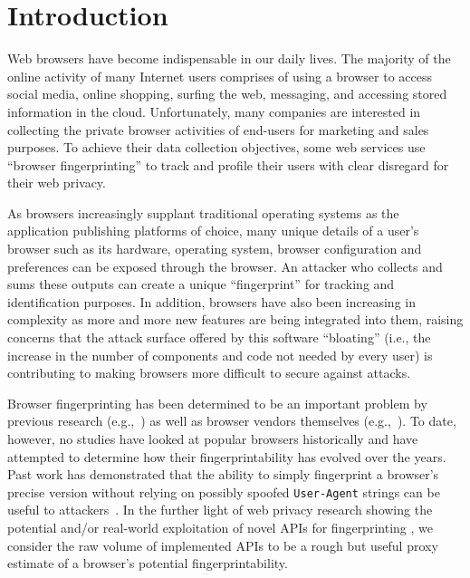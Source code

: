 \section{Introduction}
\label{sec:introduction}

Web browsers have become indispensable in our daily lives. The
majority of the online activity of many Internet users comprises of
using a browser to access social media, online shopping, surfing the
web, messaging, and accessing stored information in the cloud.
Unfortunately, many companies are interested in collecting
the private browser activities of end-users for marketing and sales
purposes. To achieve their data collection objectives, some web
services use ``browser fingerprinting'' to track and profile their
users with clear disregard for their web privacy.

As browsers increasingly supplant traditional operating systems as the
application publishing platforms of choice, 
many unique details of a user's browser such as its hardware,
operating system, browser configuration and preferences can be exposed
through the browser. An attacker who collects and sums these outputs
can create a unique ``fingerprint'' for tracking and identification
purposes. In addition, browsers have also been increasing in
complexity as more and more new features are being integrated into
them, raising concerns that the attack surface offered by this
software ``bloating'' (i.e., the increase in the number of components
and code not needed by every user) is contributing to making browsers
more difficult to secure against attacks.

Browser fingerprinting has been determined to be an important problem
by previous research
(e.g.,~\cite{cookiemonster-SP13,panopticlick,mowery2012pixel,fpdetective})
as well as browser vendors themselves (e.g.,~\cite{safari-privacy,brave-fpbudget,firefox-fingerprinting}).
 To date, however, no
studies have looked at popular browsers historically and have
attempted to determine how their fingerprintability has evolved over
the years.
Past work has demonstrated that the ability to simply fingerprint a browser's precise version without relying on possibly spoofed \texttt{User-Agent} strings can be useful to attackers~\cite{schwarz2019javascript}.
In the further light of web privacy research showing the potential and/or real-world exploitation of novel APIs for fingerprinting \cite{olejnik2017battery,acar2014web,englehardt2016online}, we consider the raw volume of implemented APIs to be a rough but useful proxy estimate of a browser's potential fingerprintability.


